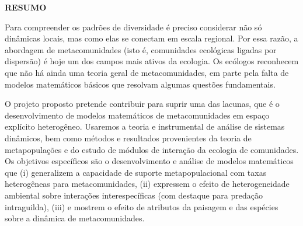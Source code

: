\documentclass[12pt]{extarticle}
\begin{document}
\setlength{\parindent}{20pt}
\thispagestyle{empty}
\begin{center}
    \bf \Large \color{blue} RESUMO
\end{center}
\vskip 3.0cm
{\it

    Para compreender os padrões de diversidade 
    é preciso considerar não só dinâmicas locais, mas como elas 
    se conectam em escala regional.
    Por essa razão, a abordagem de metacomunidades (isto é, comunidades
    ecológicas ligadas por dispersão) é hoje um dos campos mais ativos da ecologia.
    Os ecólogos reconhecem que não há ainda  uma teoria geral de metacomunidades, em parte
    pela falta de modelos matemáticos básicos que resolvam algumas questões fundamentais.
    
    O projeto proposto pretende contribuir para suprir uma das lacunas, 
    que é o desenvolvimento de modelos matemáticos de metacomunidades 
    em espaço explícito heterogêneo.
    Usaremos a teoria e instrumental de análise de sistemas dinâmicos,
    bem como métodos e resultados provenientes da teoria de
    metapopulações e do estudo de módulos de interação da ecologia de
    comunidades. Os objetivos específicos são o desenvolvimento e análise
    de modelos matemáticos que 
    (i) generalizem a capacidade de suporte metapopulacional com taxas heterogêneas para metacomunidades,
    (ii) expressem o efeito de heterogeneidade ambiental sobre interações interespecíficas 
    (com destaque para predação intraguilda), 
    (iii) e mostrem o efeito de atributos da paisagem e das espécies sobre a dinâmica
    de metacomunidades.

    
%
%
}

\newpage
\end{document}
